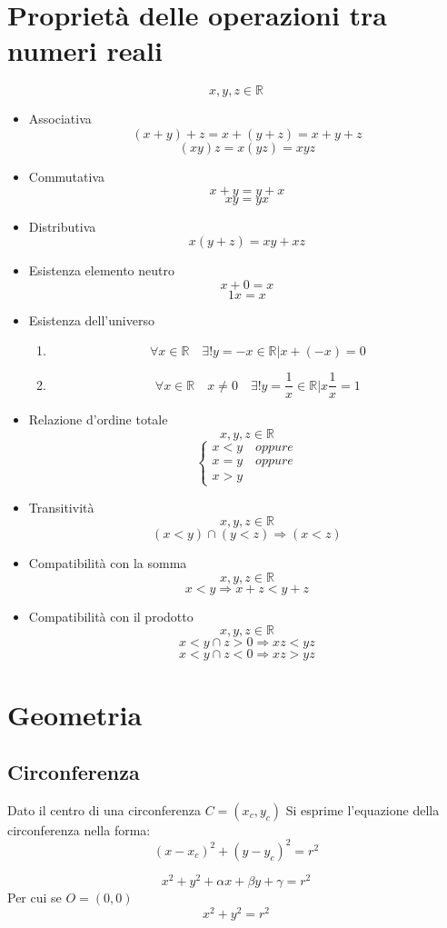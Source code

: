 \documentclass[11pt,a4paper,notitlepage]{report}
\let\numberset\mathbb
\newcommand{\R}{\numberset{R}}
\begin{document}
\section{Proprietà delle operazioni tra numeri reali}
\[x,y,z \in \R\]
\begin{itemize}
	\item Associativa
		\[(x+y)+z=x+(y+z)=x+y+z \]
		\[(xy)z=x(yz)=xyz \]
	\item Commutativa
		\[x+y=y+x\]
		\[xy=yx\]
	\item Distributiva
		\[x(y+z)=xy+xz\]
	\item Esistenza elemento neutro
		\[x+0=x\]
		\[1x=x\]
	\item Esistenza dell'universo
		\begin{enumerate}
			\item \[\forall x \in \R \quad \exists !y=-x \in \R | x+(-x)=0\]
			\item \[\forall x \in \R \quad x \neq 0 \quad \exists !y=\frac{1}{x} \in \R | x\frac{1}{x}=1 \]
		\end{enumerate}
	\item Relazione d'ordine totale
		\[x,y,z \in \R\]
		\[
		\begin{cases}
			x<y \quad oppure\\
			x=y \quad oppure\\
			x>y
		\end{cases}
		\]
	\item Transitività
		\[x,y,z \in \R\]
		\[(x<y) \cap (y<z) \Rightarrow (x<z)\]
	\item Compatibilità con la somma
		\[x,y,z \in \R\]
		\[x<y \Rightarrow x+z<y+z\]
	\item Compatibilità con il prodotto
		\[x,y,z \in \R\]
		\[x<y \cap z>0 \Rightarrow xz<yz\]
		\[x<y \cap z<0 \Rightarrow xz>yz\]
\end{itemize}

\section{Geometria}
\subsection{Circonferenza}
Dato il centro di una circonferenza $C=(x_c,y_c)$
Si esprime l'equazione della circonferenza nella forma:
\[(x-x_c)^2+(y-y_c)^2=r^2\]

\[x^2+y^2+\alpha x+ \beta y +\gamma =r^2\]
Per cui se $O=(0,0)$
\[x^2+y^2=r^2\]
\end{document}
